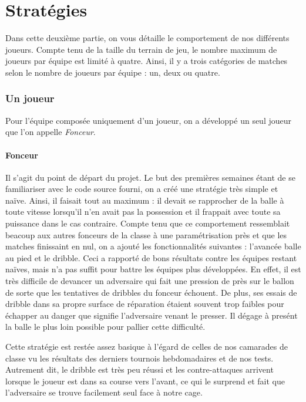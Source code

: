\documentclass[12pt,a4paper]{article}
\begin{document}
\newpage

\part{Strat\'egies}
Dans cette deuxi\`eme partie, on vous d\'etaille le comportement de nos 
diff\'erents joueurs.
Compte tenu de la taille du terrain de jeu, le nombre maximum de joueurs par 
\'equipe est limit\'e \`a quatre. 
Ainsi, il y a trois cat\'egories de matches 
selon le nombre de joueurs par \'equipe : un, deux ou quatre.

\section{Un joueur}
Pour l'\'equipe compos\'ee uniquement d'un joueur, on a d\'evelopp\'e un seul 
joueur que l'on appelle {\itshape Fonceur}. 

\subsection*{Fonceur}
Il s'agit du point de d\'epart du projet. Le but des premi\`eres semaines 
\'etant de se familiariser avec le code source fourni, on a cr\'e\'e une 
strat\'egie tr\`es simple et na\"ive. 
Ainsi, il faisait tout au maximum : il devait se rapprocher de la balle \`a 
toute vitesse lorsqu'il n'en avait pas la possession et il 
frappait avec toute sa 
puissance dans le cas contraire. 
Compte tenu que ce comportement ressemblait beacoup aux autres fonceurs de la 
classe \`a une param\'etrisation pr\`es et que les matches finissaint en nul, on 
a ajout\'e les fonctionnalit\'es suivantes : l'avanc\'ee balle au pied et le 
dribble. 
Ceci a rapport\'e de bons r\'esultats contre les \'equipes restant 
na\"ives, mais n'a pas suffit pour battre les \'equipes plus d\'evelopp\'ees. 
En effet, il est tr\`es difficile de devancer un adversaire qui fait une 
pression de pr\`es sur le ballon de sorte que les tentatives de 
dribbles du fonceur \'echouent.
De plus, ses essais de dribble dans sa propre surface de r\'eparation 
\'etaient souvent trop faibles pour \'echapper au danger que signifie 
l'adversaire venant le presser. Il d\'egage \`a pres\'ent la balle le plus loin 
possible pour pallier cette difficult\'e.

Cette strat\'egie est rest\'ee assez basique \`a l'\'egard de celles de nos 
camarades de classe vu les r\'esultats des derniers tournois hebdomadaires et 
de nos tests. Autrement dit, le dribble est tr\`es peu r\'eussi et les 
contre-attaques arrivent lorsque le joueur est dans sa course vers l'avant, ce 
qui le surprend et fait que l'adversaire se trouve facilement seul face \`a 
notre cage.
\end{document}
